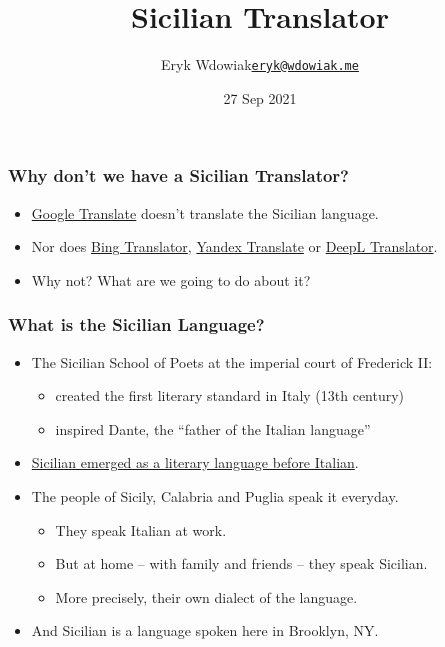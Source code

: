 \documentclass{beamer}
\title{Sicilian Translator}
\author{\texorpdfstring{Eryk Wdowiak\newline\href{eryk@wdowiak.me}{\texttt{eryk@wdowiak.me}}}{Eryk Wdowiak}}
\institute{Arba Sicula}
\date{27 Sep 2021}
\begin{document}

\begin{frame}
  \titlepage
\end{frame}


\begin{frame}
  \frametitle{Why don't we have a Sicilian Translator?}
  \vspace{-1.0em}
  \begin{itemize}
  \item \href{https://translate.google.com/}{Google Translate} doesn't translate the Sicilian language.
  \item Nor does \href{https://www.bing.com/translator/}{Bing Translator},
    \href{https://translate.yandex.com/}{Yandex Translate} or
    \href{https://www.deepl.com/translator}{DeepL Translator}.
    \vspace{1em}
    \item Why not?  What are we going to do about it?
  \end{itemize} 
\end{frame}


\begin{frame}
  \frametitle{What is the Sicilian Language?}
  \vspace{-1.0em}
  \begin{itemize}
  \item The Sicilian School of Poets at the imperial court of Frederick II:
    \begin{itemize}
    \item created the first literary standard in Italy (13th century)
    \item inspired Dante, the ``father of the Italian language''
    \end{itemize}
  \vspace{0.65em}
  \item \underline{Sicilian emerged as a literary language before Italian}.
  \vspace{1em}
  \item The people of Sicily, Calabria and Puglia speak it everyday.
    \begin{itemize}
    \item They speak Italian at work.
    \item But at home -- with family and friends -- they speak Sicilian.
    \item More precisely, their own dialect of the language.
    \end{itemize}
  \vspace{0.65em}
  \item And Sicilian is a language spoken here in Brooklyn, NY.
  \end{itemize} 
\end{frame}
\end{document}
